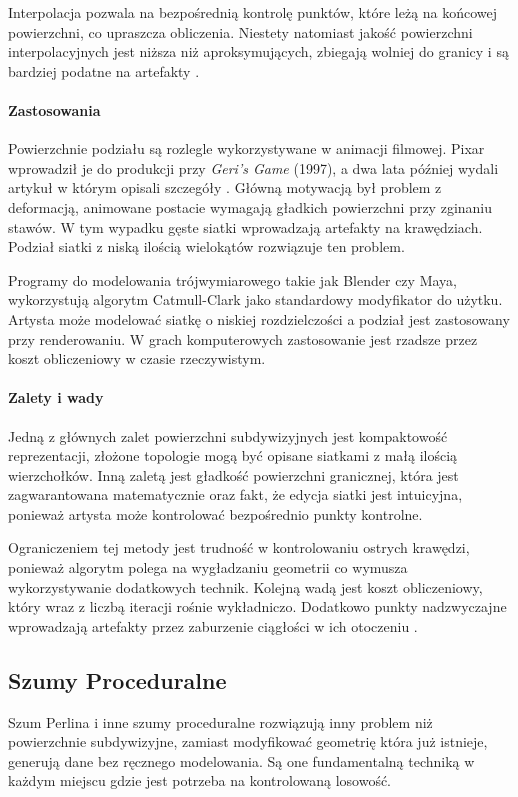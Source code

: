 Interpolacja pozwala na bezpośrednią kontrolę punktów, które leżą na końcowej powierzchni, co upraszcza obliczenia. Niestety natomiast jakość powierzchni interpolacyjnych jest niższa niż aproksymujących, zbiegają wolniej do granicy i są bardziej podatne na artefakty \cite{zorin2000}.


\paragraph{Zastosowania}
Powierzchnie podziału są rozlegle wykorzystywane w animacji filmowej. Pixar wprowadził je do produkcji przy \textit{Geri's Game} (1997), a dwa lata później wydali artykuł w którym opisali szczegóły \cite{derose1998}. Główną motywacją był problem z deformacją, animowane postacie wymagają gładkich powierzchni przy zginaniu stawów. W tym wypadku gęste siatki wprowadzają artefakty na krawędziach. Podział siatki z niską ilością wielokątów rozwiązuje ten problem.

Programy do modelowania trójwymiarowego takie jak Blender czy Maya, wykorzystują algorytm Catmull-Clark jako standardowy modyfikator do użytku. Artysta może modelować siatkę o niskiej rozdzielczości a podział jest zastosowany przy renderowaniu. W grach komputerowych zastosowanie jest rzadsze przez koszt obliczeniowy w czasie rzeczywistym.

\paragraph{Zalety i wady}
Jedną z głównych zalet powierzchni subdywizyjnych jest kompaktowość reprezentacji, złożone topologie mogą być opisane siatkami z małą ilością wierzchołków. Inną zaletą jest gładkość powierzchni granicznej, która jest zagwarantowana matematycznie oraz fakt, że edycja siatki jest intuicyjna, ponieważ artysta może kontrolować bezpośrednio punkty kontrolne.

Ograniczeniem tej metody jest trudność w kontrolowaniu ostrych krawędzi, ponieważ algorytm polega na wygładzaniu geometrii co wymusza wykorzystywanie dodatkowych technik. Kolejną wadą jest koszt obliczeniowy, który wraz z liczbą iteracji rośnie wykładniczo. Dodatkowo punkty nadzwyczajne wprowadzają artefakty przez zaburzenie ciągłości w ich otoczeniu \cite{catmull1978}.

\subsection{Szumy Proceduralne}
Szum Perlina i inne szumy proceduralne rozwiązują inny problem niż powierzchnie subdywizyjne, zamiast modyfikować geometrię która już istnieje, generują dane bez ręcznego modelowania. Są one fundamentalną techniką w każdym miejscu gdzie jest potrzeba na kontrolowaną losowość.

